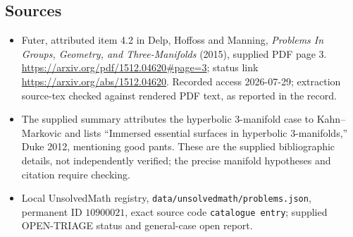 \documentclass[11pt]{article}
\begin{document}
\subsection{Sources}
\begin{itemize}
\item Futer, attributed item 4.2 in Delp, Hoffoss and Manning, \emph{Problems In Groups, Geometry, and Three-Manifolds} (2015), supplied PDF page 3. \url{https://arxiv.org/pdf/1512.04620#page=3}; status link \url{https://arxiv.org/abs/1512.04620}. Recorded access 2026-07-29; extraction source-tex checked against rendered PDF text, as reported in the record.
\item The supplied summary attributes the hyperbolic \(3\)-manifold case to Kahn--Markovic and lists ``Immersed essential surfaces in hyperbolic 3-manifolds,'' Duke 2012, mentioning good pants. These are the supplied bibliographic details, not independently verified; the precise manifold hypotheses and citation require checking.
\item Local UnsolvedMath registry, \texttt{data/unsolvedmath/problems.json}, permanent ID \(10900021\), exact source code \texttt{catalogue entry}; supplied OPEN-TRIAGE status and general-case open report.
\end{itemize}
\end{document}

